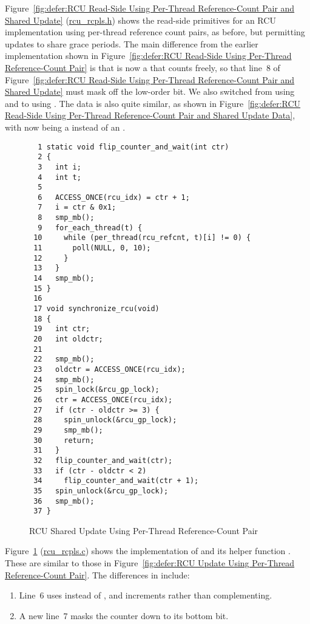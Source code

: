 Figure~\ref{fig:defer:RCU Read-Side Using Per-Thread Reference-Count Pair and Shared Update}
(\url{rcu_rcpls.h})
shows the read-side primitives for an RCU implementation using per-thread
reference count pairs, as before, but permitting updates to share
grace periods.
The main difference from the earlier implementation shown in
Figure~\ref{fig:defer:RCU Read-Side Using Per-Thread Reference-Count Pair}
is that  is now a  that counts freely,
so that line~8 of
Figure~\ref{fig:defer:RCU Read-Side Using Per-Thread Reference-Count Pair and Shared Update}
must mask off the low-order bit.
We also switched from using  and 
to using .
The data is also quite similar, as shown in
Figure~\ref{fig:defer:RCU Read-Side Using Per-Thread Reference-Count Pair and Shared Update Data},
with  now being a  instead of an
.

\begin{figure}[tbp]
{ \scriptsize
\begin{verbatim}
  1 static void flip_counter_and_wait(int ctr)
  2 {
  3   int i;
  4   int t;
  5
  6   ACCESS_ONCE(rcu_idx) = ctr + 1;
  7   i = ctr & 0x1;
  8   smp_mb();
  9   for_each_thread(t) {
 10     while (per_thread(rcu_refcnt, t)[i] != 0) {
 11       poll(NULL, 0, 10);
 12     }
 13   }
 14   smp_mb();
 15 }
 16
 17 void synchronize_rcu(void)
 18 {
 19   int ctr;
 20   int oldctr;
 21
 22   smp_mb();
 23   oldctr = ACCESS_ONCE(rcu_idx);
 24   smp_mb();
 25   spin_lock(&rcu_gp_lock);
 26   ctr = ACCESS_ONCE(rcu_idx);
 27   if (ctr - oldctr >= 3) {
 28     spin_unlock(&rcu_gp_lock);
 29     smp_mb();
 30     return;
 31   }
 32   flip_counter_and_wait(ctr);
 33   if (ctr - oldctr < 2)
 34     flip_counter_and_wait(ctr + 1);
 35   spin_unlock(&rcu_gp_lock);
 36   smp_mb();
 37 }
\end{verbatim}
}
\caption{RCU Shared Update Using Per-Thread Reference-Count Pair}
\label{fig:defer:RCU Shared Update Using Per-Thread Reference-Count Pair}
\end{figure}

Figure~\ref{fig:defer:RCU Shared Update Using Per-Thread Reference-Count Pair}
(\url{rcu_rcpls.c})
shows the implementation of  and its helper
function .
These are similar to those in
Figure~\ref{fig:defer:RCU Update Using Per-Thread Reference-Count Pair}.
The differences in  include:
\begin{enumerate}
\item	Line~6 uses  instead of ,
	and increments rather than complementing.
\item	A new line~7 masks the counter down to its bottom bit.
\end{enumerate}

